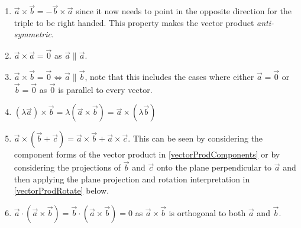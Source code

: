 \documentclass[../main.tex]{subfiles}
\begin{document}
\begin{enumerate}
  \item $\vec{a} \times \vec{b} = - \vec{b} \times \vec{a}$ since it now needs to point in the opposite direction for the triple to be right handed.
    This property makes the vector product \textit{anti-symmetric}.
  \item $\vec{a} \times \vec{a} = \vec{0}$ as $\vec{a} \parallel \vec{a}$.
  \item $\vec{a} \times \vec{b} = \vec{0} \iff \vec{a} \parallel \vec{b}$, note that this includes the cases where either $\vec{a} = \vec{0}$ or $\vec{b} = \vec{0}$ as $\vec{0}$ is parallel to every vector.
  \item $(\lambda \vec{a}) \times \vec{b} = \lambda (\vec{a} \times \vec{b}) = \vec{a} \times (\lambda \vec{b})$
  \item $\vec{a} \times (\vec{b} + \vec{c}) = \vec{a} \times \vec{b} + \vec{a} \times \vec{c}$. This can be seen by considering the component forms of the vector product in \cref{vectorProdComponents} or by considering the projections of $\vec{b}$ and $\vec{c}$ onto the plane perpendicular to $\vec{a}$ and then applying the plane projection and rotation interpretation in \cref{vectorProdRotate} below.
  \item $\vec{a} \cdot (\vec{a} \times \vec{b}) = \vec{b} \cdot (\vec{a} \times \vec{b}) = 0$ as $\vec{a} \times \vec{b}$ is orthogonal to both $\vec{a}$ and $\vec{b}$.
\end{enumerate}
\end{document}
